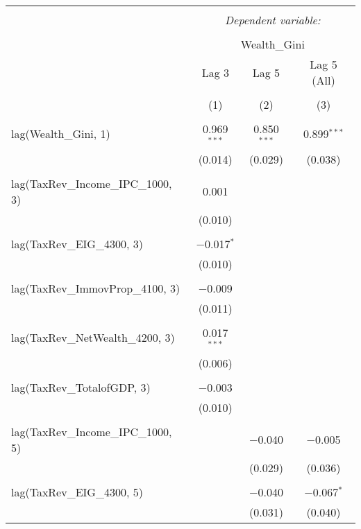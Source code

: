 
\begin{table}[!htbp] \centering 
  \caption{} 
  \label{} 
\begin{tabular}{@{\extracolsep{5pt}}lccc} 
\\[-1.8ex]\hline 
\hline \\[-1.8ex] 
 & \multicolumn{3}{c}{\textit{Dependent variable:}} \\ 
\cline{2-4} 
\\[-1.8ex] & \multicolumn{3}{c}{Wealth\_Gini} \\ 
 & Lag 3 & Lag 5 & Lag 5 (All) \\ 
\\[-1.8ex] & (1) & (2) & (3)\\ 
\hline \\[-1.8ex] 
 lag(Wealth\_Gini, 1) & 0.969$^{***}$ & 0.850$^{***}$ & 0.899$^{***}$ \\ 
  & (0.014) & (0.029) & (0.038) \\ 
  & & & \\ 
 lag(TaxRev\_Income\_IPC\_1000, 3) & 0.001 &  &  \\ 
  & (0.010) &  &  \\ 
  & & & \\ 
 lag(TaxRev\_EIG\_4300, 3) & $-$0.017$^{*}$ &  &  \\ 
  & (0.010) &  &  \\ 
  & & & \\ 
 lag(TaxRev\_ImmovProp\_4100, 3) & $-$0.009 &  &  \\ 
  & (0.011) &  &  \\ 
  & & & \\ 
 lag(TaxRev\_NetWealth\_4200, 3) & 0.017$^{***}$ &  &  \\ 
  & (0.006) &  &  \\ 
  & & & \\ 
 lag(TaxRev\_TotalofGDP, 3) & $-$0.003 &  &  \\ 
  & (0.010) &  &  \\ 
  & & & \\ 
 lag(TaxRev\_Income\_IPC\_1000, 5) &  & $-$0.040 & $-$0.005 \\ 
  &  & (0.029) & (0.036) \\ 
  & & & \\ 
 lag(TaxRev\_EIG\_4300, 5) &  & $-$0.040 & $-$0.067$^{*}$ \\ 
  &  & (0.031) & (0.040) \\ 

\end{tabular}
\end{table}
